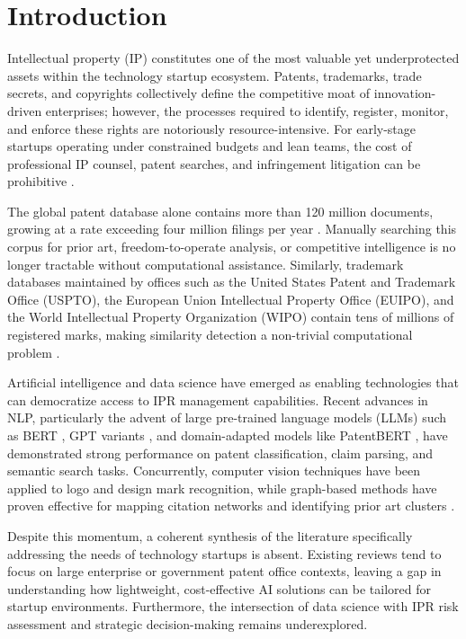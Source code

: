 \documentclass[conference]{IEEEtran}
\begin{document}
\section{Introduction}

Intellectual property (IP) constitutes one of the most valuable yet underprotected assets within the technology startup ecosystem. Patents, trademarks, trade secrets, and copyrights collectively define the competitive moat of innovation-driven enterprises; however, the processes required to identify, register, monitor, and enforce these rights are notoriously resource-intensive. For early-stage startups operating under constrained budgets and lean teams, the cost of professional IP counsel, patent searches, and infringement litigation can be prohibitive \cite{ref1, ref2}.

The global patent database alone contains more than 120 million documents, growing at a rate exceeding four million filings per year \cite{ref3}. Manually searching this corpus for prior art, freedom-to-operate analysis, or competitive intelligence is no longer tractable without computational assistance. Similarly, trademark databases maintained by offices such as the United States Patent and Trademark Office (USPTO), the European Union Intellectual Property Office (EUIPO), and the World Intellectual Property Organization (WIPO) contain tens of millions of registered marks, making similarity detection a non-trivial computational problem \cite{ref4}.

Artificial intelligence and data science have emerged as enabling technologies that can democratize access to IPR management capabilities. Recent advances in NLP, particularly the advent of large pre-trained language models (LLMs) such as BERT \cite{ref5}, GPT variants \cite{ref6}, and domain-adapted models like PatentBERT \cite{ref7}, have demonstrated strong performance on patent classification, claim parsing, and semantic search tasks. Concurrently, computer vision techniques have been applied to logo and design mark recognition, while graph-based methods have proven effective for mapping citation networks and identifying prior art clusters \cite{ref8}.

Despite this momentum, a coherent synthesis of the literature specifically addressing the needs of technology startups is absent. Existing reviews tend to focus on large enterprise or government patent office contexts, leaving a gap in understanding how lightweight, cost-effective AI solutions can be tailored for startup environments. Furthermore, the intersection of data science with IPR risk assessment and strategic decision-making remains underexplored.
\end{document}
